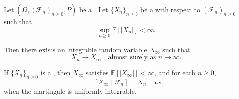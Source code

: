 \begin{theorem} \label{theorem:martingale_convergence_theorem_for_l1_bounded_supermartingales}
Let $(\Omega, (\mathcal{F}_n)_{n \geq 0}, P)$ be a . Let $\{X_n\}_{n \geq 0}$ be a  with respect to $(\mathcal{F}_n)_{n \geq 0}$ such that
$$\sup_{n \geq 0} \mathbb{E}[|X_n|] < \infty.$$

Then there exists an integrable random variable $X_\infty$ such that
$$X_n \to X_\infty \quad \text{almost surely as } n \to \infty.$$

If $\{X_n\}_{n \geq 0}$ is a , then $X_\infty$ satisfies $\mathbb{E}[|X_\infty|] < \infty$, and for each $n \geq 0$,
$$\mathbb{E}[X_\infty \mid \mathcal{F}_n] = X_n \quad \text{a.s.}$$
when the martingale is uniformly integrable.
\end{theorem}
